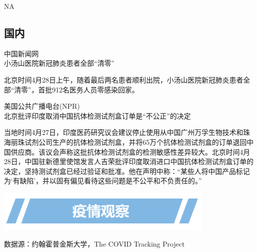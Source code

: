 \documentclass[
]{article}
\begin{document}
NA

\vspace{5mm}

\hypertarget{section-1}{%
\subsection{\texorpdfstring{\textcolor{glaucous}{\Huge 国内}}{}}\label{section-1}}

\vspace{-3mm}

\begin{center}
\textcolor{glaucous}{中国新闻网}\\小汤山医院新冠肺炎患者全部“清零”

\end{center}

北京时间4月28日上午，随着最后两名患者顺利出院，小汤山医院新冠肺炎患者全部``清零''，首批912名医务人员零感染回家。

\begin{center}
\textcolor{glaucous}{美国公共广播电台(NPR)}\\北京批评印度取消中国抗体检测试剂盒订单是“不公正”的决定
\end{center}

当地时间4月27日，印度医药研究议会建议停止使用从中国广州万孚生物技术和珠海丽珠试剂公司生产的抗体检测试剂盒，并将65万个抗体检测试剂盒的订单退回中国供应商。该议会声称这批抗体检测试剂盒的检测敏感性差异较大。北京时间4月28日，中国驻新德里使馆发言人吉荣批评印度取消进口中国抗体检测试剂盒订单的决定，坚持测试剂盒已经过验证和批准。他在声明中称：``某些人将中国产品标记为`有缺陷'，并以固有偏见看待这些问题是不公平和不负责任的。''

\vspace{5mm}

\begin{center}
\includegraphics[height=2cm]{./input/title2.png} 
\end{center}

\begin{Large}
\vspace{-7mm}
{数据源：约翰霍普金斯大学，The COVID Tracking  Project}
\end{Large}

\vspace{-7mm}
\end{document}
